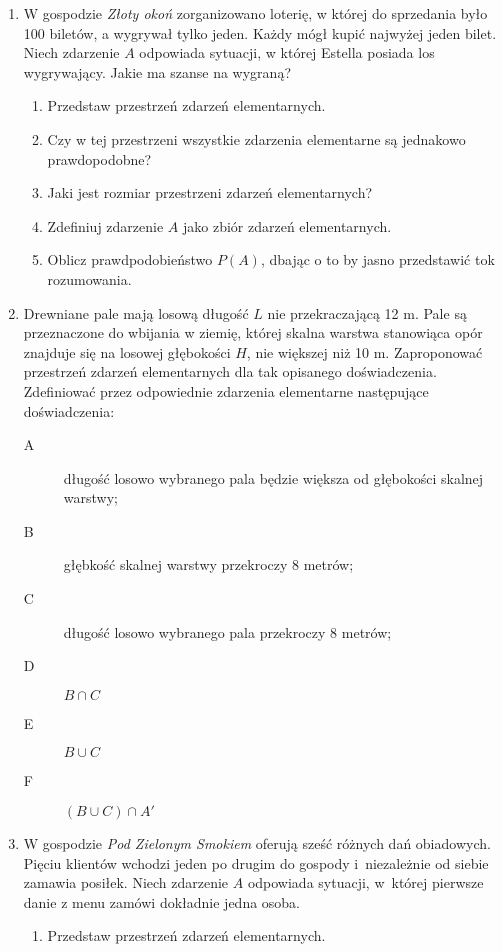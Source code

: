 \documentclass{mwart}
\newcommand{\ans}[1]{}
\newcommand{\ans}[1]{\emph{Odpowiedź:} #1}
\begin{document}
\begin{enumerate}
\item W gospodzie \emph{Złoty okoń} zorganizowano loterię, w której do sprzedania było 100 biletów, a wygrywał tylko jeden. Każdy mógł kupić najwyżej jeden bilet. Niech zdarzenie $A$ odpowiada sytuacji, w której Estella posiada los wygrywający. Jakie ma szanse na wygraną?
\begin{enumerate}%
\item Przedstaw przestrzeń zdarzeń elementarnych. \ans{$\Omega=\{\omega_n|n=1,2,\ldots,100\}$}%
\item Czy w tej przestrzeni wszystkie zdarzenia elementarne są jednakowo prawdopodobne? \ans{Tak}%
\item Jaki jest rozmiar przestrzeni zdarzeń elementarnych? \ans{$\left|\Omega\right|=100$}%
\item Zdefiniuj zdarzenie $A$ jako zbiór zdarzeń elementarnych. \ans{$A=\{\omega_1$\}}%
\item Oblicz prawdpodobieństwo $P(A)$, dbając o to by jasno przedstawić tok rozumowania. \ans{$P(A)=\frac{1}{100}$}%
\end{enumerate}%
\item  Drewniane pale mają losową długość $L$ nie przekraczającą 12 m. Pale są przeznaczone do wbijania w ziemię, której skalna warstwa stanowiąca opór znajduje się na losowej głębokości $H$, nie większej niż 10 m. Zaproponować przestrzeń zdarzeń elementarnych dla tak opisanego doświadczenia. Zdefiniować przez odpowiednie zdarzenia elementarne następujące doświadczenia:
\begin{description}
\item[A] długość losowo wybranego pala będzie większa od głębokości skalnej warstwy;
\item[B] głębkość skalnej warstwy przekroczy 8 metrów;
\item[C] długość losowo wybranego pala przekroczy 8 metrów;
\item[D] $B\cap C$
\item[E] $B\cup C$
\item[F] $(B\cup C)\cap A'$
\end{description}
\item W gospodzie \emph{Pod Zielonym Smokiem} oferują sześć różnych dań obiadowych. Pięciu klientów wchodzi jeden po drugim do gospody
i~niezależnie od siebie zamawia posiłek. Niech zdarzenie $A$ odpowiada sytuacji, w~której pierwsze danie z menu zamówi dokładnie jedna osoba.%
\begin{enumerate}%
\item Przedstaw przestrzeń zdarzeń elementarnych. \ans{$\Omega=\{\omega_{i_1,\ldots,i_5}|i_j=1,2,\ldots,6\}$}%

\end{enumerate}
\end{enumerate}
\end{document}
